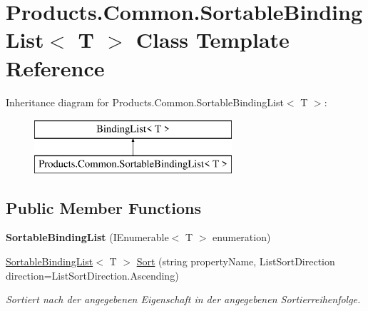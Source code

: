 \hypertarget{class_products_1_1_common_1_1_sortable_binding_list}{}\section{Products.\+Common.\+Sortable\+Binding\+List$<$ T $>$ Class Template Reference}
\label{class_products_1_1_common_1_1_sortable_binding_list}
Inheritance diagram for Products.\+Common.\+Sortable\+Binding\+List$<$ T $>$\+:\begin{figure}[H]
\begin{center}
\leavevmode
\includegraphics[height=2.000000cm]{class_products_1_1_common_1_1_sortable_binding_list}
\end{center}
\end{figure}
\subsection*{Public Member Functions}
\begin{DoxyCompactItemize}
\item 
{\bfseries Sortable\+Binding\+List} (I\+Enumerable$<$ T $>$ enumeration)\hypertarget{class_products_1_1_common_1_1_sortable_binding_list_afe94d395b08c4e8fee0226f4a105dfec}{}\label{class_products_1_1_common_1_1_sortable_binding_list_afe94d395b08c4e8fee0226f4a105dfec}

\item 
\hyperlink{class_products_1_1_common_1_1_sortable_binding_list}{Sortable\+Binding\+List}$<$ T $>$ \hyperlink{class_products_1_1_common_1_1_sortable_binding_list_acc3c7658495eb666c7a892352ee3856f}{Sort} (string property\+Name, List\+Sort\+Direction direction=List\+Sort\+Direction.\+Ascending)
\begin{DoxyCompactList}\small\item\em Sortiert nach der angegebenen Eigenschaft in der angegebenen Sortierreihenfolge. \end{DoxyCompactList}\end{DoxyCompactItemize}
